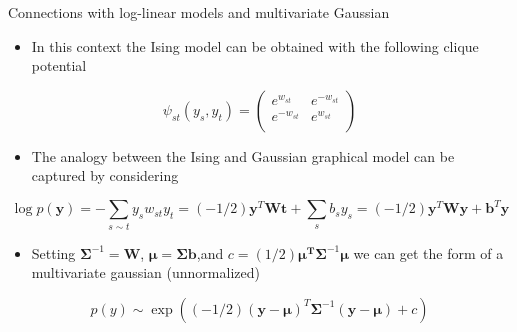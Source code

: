 \documentclass{beamer}
\begin{document}
\begin{frame}{Connections with log-linear models and multivariate Gaussian   \cite{murphy2012machine}}
\begin{itemize}
\item In this context the Ising model can be obtained with the following clique potential 
\end{itemize}
\begin{equation}
\psi_{st}\left(y_{s},y_{t}\right) =
\begin{pmatrix}
e^{w_{st}} & e^{-w_{st}} \\
e^{-w_{st}} & e^{w_{st}} \\
\end{pmatrix}
\end{equation}
\begin{itemize}
\item The analogy between the Ising and Gaussian graphical model can be captured by considering 
\end{itemize}
\begin{equation*}
\log p(\textbf{y})=-\sum_{s\sim t}y_{s}w_{st}y_{t}=(-1/2)\textbf{y}^{T}\textbf{W}\textbf{t}+\sum_{s}b_{s}y_{s}=(-1/2)\textbf{y}^{T}\textbf{W}\textbf{y}+\textbf{b}^{T}\textbf{y}
\end{equation*}
\begin{itemize}
\item Setting $\bm{\Sigma}^{-1}=\textbf{W}$, $\bm{\mu}=\bm{\Sigma} \textbf{b}$,and $c=(1/2)\bm{\mu^{T}}\bm{\Sigma}^{-1}\bm{\mu}$ we can get the form of a multivariate gaussian (unnormalized)
\end{itemize}
\begin{equation*}
p(y)\sim \exp \left((-1/2)(\textbf{y}-\bm{\mu})^{T}\bm{\Sigma}^{-1}(\textbf{y}-\bm{\mu})+c\right)
\end{equation*}
\end{frame}
\end{document}
